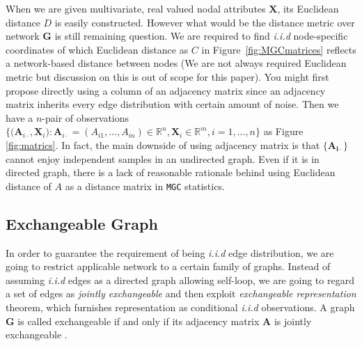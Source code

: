 \documentclass[12pt]{article}
\theoremstyle{definition}
\begin{document}
When we are given multivariate, real valued nodal attributes $\mathbf{X}$, its Euclidean distance $D$ is easily constructed. However what would be the distance metric over network $\mathbf{G}$ is still remaining question. We are required to find \textit{i.i.d} node-specific coordinates of which Euclidean distance as $C$ in Figure~\ref{fig:MGCmatrices} reflects a network-based distance between nodes (We are not always required Euclidean metric \citep{lyons2013distance} but discussion on this is out of scope for this paper). You might first propose directly using a column of an adjacency matrix since an adjacency matrix inherits every edge distribution with certain amount of noise. Then we have a $n$-pair of observations $\big\{ \big( \mathbf{A}_{i \cdot} , \mathbf{X}_{i} \big) : \mathbf{A}_{i \cdot} = (A_{i 1} , ... , A_{i n} ) \in \mathbb{R}^{n}, \mathbf{X}_{i} \in \mathbb{R}^{m}, i=1,...,n  \big\}$ as Figure \ref{fig:matrics}. In fact, the main downside of using adjacency matrix is that $\{ \mathbf{A_{i \cdot}}  \}$ cannot enjoy independent samples in an undirected graph. Even if it is in directed graph, there is a lack of reasonable rationale behind using Euclidean distance of $A$ as a distance matrix in \texttt{MGC} statistics. 
	
\subsection{Exchangeable Graph}

In order to guarantee the requirement of being \textit{i.i.d} edge distribution, we are going to restrict applicable network to a certain family of graphs. Instead of assuming \textit{i.i.d} edges as a directed graph allowing self-loop, we are going to regard a set of edges as \textit{jointly exchangeable} and then exploit \textit{exchangeable representation} theorem, which furnishes representation as conditional \textit{i.i.d} observations. A graph $\mathbf{G}$ is called exchangeable if and only if its adjacency matrix $\mathbf{A}$ is jointly exchangeable \citep{orbanz2015bayesian}. 
	
\end{document}
